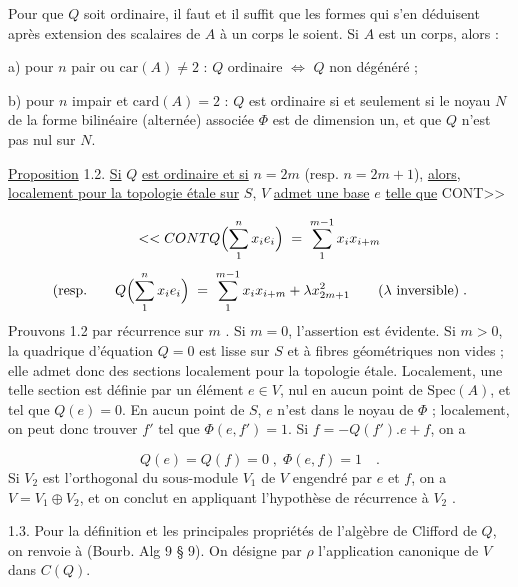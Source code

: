 Pour que $Q$ soit ordinaire, il faut et il suffit que les formes qui s'en déduisent après extension des scalaires de $A$ à un corps le soient. Si $A$ est un corps, alors :

a) pour $n$ pair ou $\mathrm{car}(A) \neq 2$ : $Q$ ordinaire $\Longleftrightarrow$ $Q$ non dégénéré ;

b) pour $n$ impair et $\mathrm{card}(A) = 2$ : $Q$ est ordinaire si et seulement si le noyau $N$ de la forme bilinéaire (alternée) associée $\Phi$ est de dimension un, et que $Q$ n'est pas nul sur $N$.

\underline{Proposition} 1.2. \underline{Si} $Q$ \underline{est ordinaire et si} $n = 2m$ (resp. $n = 2m +1$), \underline{alors}, \underline{localement pour la topologie étale sur} $S$, $V$ \underline{admet une base} \underline{$e$} \underline{telle que} CONT>>



\begin{equation*}
<<CONT Q\Bigl( \sum_{1}^{n} x_i e_i \Bigr) \;=\; \sum_{1}^{m-1} x_i x_{i+m}
\end{equation*}
\begin{equation*}
\text{(resp.} \qquad Q\Bigl( \sum_{1}^{n} x_i e_i \Bigr) \;=\; \sum_{1}^{m-1} x_i x_{i+m} + \lambda x_{2m+1}^{2} \qquad (\lambda \text{ inversible}) \;.
\end{equation*}
Prouvons 1.2 par récurrence sur $m$ . Si $m = 0$, l'assertion est évidente. Si $m > 0$, la quadrique d'équation $Q = 0$ est lisse sur $S$ et à fibres géométriques non vides ; elle admet donc des sections localement pour la topologie étale. Localement, une telle section est définie par un élément $e \in V$, nul en aucun point de $\mathrm{Spec}(A)$, et tel que $Q(e) = 0$. En aucun point de $S$, $e$ n'est dans le noyau de $\Phi$ ; localement, on peut donc trouver $f'$ tel que $\Phi(e,f') = 1$. Si $f = -Q(f').e+f$, on a

\begin{equation*}
Q(e) = Q(f) = 0 \;,\; \Phi(e,f) = 1 \quad .
\end{equation*}
Si $V_2$ est l'orthogonal du sous-module $V_1$ de $V$ engendré par $e$ et $f$, on a $V = V_1 \oplus V_2$, et on conclut en appliquant l'hypothèse de récurrence à $V_2$ .

1.3. Pour la définition et les principales propriétés de l'algèbre de Clifford de $Q$, on renvoie à (Bourb. Alg 9 \S{} 9). On désigne par $\rho$ l'application canonique de $V$ dans $C(Q)$.

